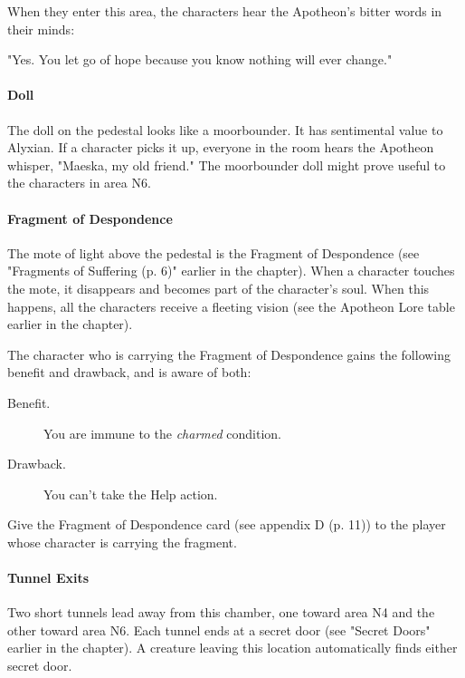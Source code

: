 \documentclass[letterpaper, 11pt, bg=full, twocolumn]{dndbook}
\begin{document}
When they enter this area, the characters hear the Apotheon's bitter words in their minds:

\begin{DndReadAloud}
"Yes. You let go of hope because you know nothing will ever change."
\end{DndReadAloud}

\paragraph{Doll}

The doll on the pedestal looks like a moorbounder. It has sentimental value to Alyxian. If a character picks it up, everyone in the room hears the Apotheon whisper, "Maeska, my old friend." The moorbounder doll might prove useful to the characters in area N6.

\paragraph{Fragment of Despondence}

The mote of light above the pedestal is the Fragment of Despondence (see "Fragments of Suffering (p. 6)" earlier in the chapter). When a character touches the mote, it disappears and becomes part of the character's soul. When this happens, all the characters receive a fleeting vision (see the Apotheon Lore table earlier in the chapter).

The character who is carrying the Fragment of Despondence gains the following benefit and drawback, and is aware of both:

\begin{DndSidebar}{}
\begin{description}
\item[Benefit.] You are immune to the \textit{charmed} condition.
\item[Drawback.] You can't take the Help action.
\end{description}
\end{DndSidebar}

Give the Fragment of Despondence card (see appendix D (p. 11)) to the player whose character is carrying the fragment.

\paragraph{Tunnel Exits}

Two short tunnels lead away from this chamber, one toward area N4 and the other toward area N6. Each tunnel ends at a secret door (see "Secret Doors" earlier in the chapter). A creature leaving this location automatically finds either secret door.
\end{document}
